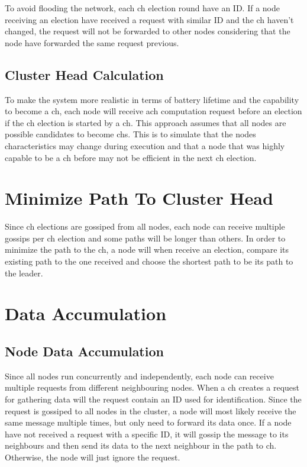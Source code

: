 \documentclass[USenglish]{uit-thesis}
\begin{document}
To avoid flooding the network, each \gls{ch} election round have an ID. If a node receiving an election have received a request with similar ID and the \gls{ch} haven't changed, the request will not be forwarded to other nodes considering that the node have forwarded the same request previous.

\subsection{Cluster Head Calculation}
To make the system more realistic in terms of battery lifetime and the capability to become a \gls{ch}, each node will receive a\gls{ch} computation request before an election if the \gls{ch} election is started by a \gls{ch}. This approach assumes that all nodes are possible candidates to become \gls{ch}s. This is to simulate that the nodes characteristics may change during execution and that a node that was highly capable to be a \gls{ch} before may not be efficient in the next \gls{ch} election.


\section{Minimize Path To Cluster Head}
Since \gls{ch} elections are gossiped from all nodes, each node can receive multiple gossips per \gls{ch} election and some paths will be longer than others. In order to minimize the path to the \gls{ch}, a node will when receive an election, compare its existing path to the one received \cite{dijkstra} and choose the shortest path to be its path to the leader.





\section{Data Accumulation}


\subsection{Node Data Accumulation}
Since all nodes run concurrently and independently, each node can receive multiple requests from different neighbouring nodes. When a \gls{ch} creates a request for gathering data will the request contain an ID used for identification. Since the request is gossiped to all nodes in the cluster, a node will most likely receive the same message multiple times, but only need to forward its data once. If a node have not received a request with a specific ID, it will gossip the message to its neighbours and then send its data to the next neighbour in the path to \gls{ch}. Otherwise, the node will just ignore the request.
\end{document}
